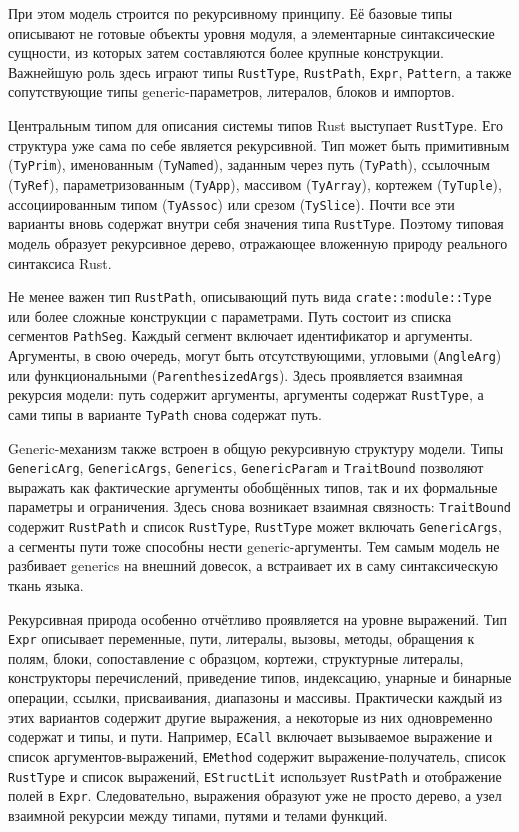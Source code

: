 \documentclass[a4paper,12pt]{article}
\begin{document}
При этом модель строится по рекурсивному принципу. Её базовые типы описывают не готовые
объекты уровня модуля, а элементарные синтаксические сущности, из которых затем
составляются более крупные конструкции. Важнейшую роль здесь играют типы
\texttt{RustType}, \texttt{RustPath}, \texttt{Expr}, \texttt{Pattern}, а также
сопутствующие типы generic-параметров, литералов, блоков и импортов.

Центральным типом для описания системы типов Rust выступает \texttt{RustType}. Его
структура уже сама по себе является рекурсивной. Тип может быть примитивным
(\texttt{TyPrim}), именованным (\texttt{TyNamed}), заданным через путь
(\texttt{TyPath}), ссылочным (\texttt{TyRef}), параметризованным
(\texttt{TyApp}), массивом (\texttt{TyArray}), кортежем (\texttt{TyTuple}),
ассоциированным типом (\texttt{TyAssoc}) или срезом (\texttt{TySlice}). Почти все эти
варианты вновь содержат внутри себя значения типа \texttt{RustType}. Поэтому типовая
модель образует рекурсивное дерево, отражающее вложенную природу реального синтаксиса
Rust.

Не менее важен тип \texttt{RustPath}, описывающий путь вида \texttt{crate::module::Type}
или более сложные конструкции с параметрами. Путь состоит из списка сегментов
\texttt{PathSeg}. Каждый сегмент включает идентификатор и аргументы. Аргументы, в свою
очередь, могут быть отсутствующими, угловыми (\texttt{AngleArg}) или функциональными
(\texttt{ParenthesizedArgs}). Здесь проявляется взаимная рекурсия модели: путь содержит
аргументы, аргументы содержат \texttt{RustType}, а сами типы в варианте
\texttt{TyPath} снова содержат путь.

Generic-механизм также встроен в общую рекурсивную структуру модели. Типы
\texttt{GenericArg}, \texttt{GenericArgs}, \texttt{Generics}, \texttt{GenericParam} и
\texttt{TraitBound} позволяют выражать как фактические аргументы обобщённых типов, так и
их формальные параметры и ограничения. Здесь снова возникает взаимная связность:
\texttt{TraitBound} содержит \texttt{RustPath} и список \texttt{RustType},
\texttt{RustType} может включать \texttt{GenericArgs}, а сегменты пути тоже способны
нести generic-аргументы. Тем самым модель не разбивает generics на внешний довесок, а
встраивает их в саму синтаксическую ткань языка.

Рекурсивная природа особенно отчётливо проявляется на уровне выражений. Тип
\texttt{Expr} описывает переменные, пути, литералы, вызовы, методы, обращения к полям,
блоки, сопоставление с образцом, кортежи, структурные литералы, конструкторы
перечислений, приведение типов, индексацию, унарные и бинарные операции, ссылки,
присваивания, диапазоны и массивы. Практически каждый из этих вариантов содержит другие
выражения, а некоторые из них одновременно содержат и типы, и пути. Например,
\texttt{ECall} включает вызываемое выражение и список аргументов-выражений,
\texttt{EMethod} содержит выражение-получатель, список \texttt{RustType} и список
выражений, \texttt{EStructLit} использует \texttt{RustPath} и отображение полей в
\texttt{Expr}. Следовательно, выражения образуют уже не просто дерево, а узел взаимной
рекурсии между типами, путями и телами функций.
\end{document}
